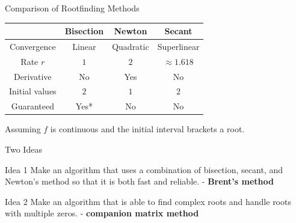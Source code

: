 \documentclass[10pt]{beamer}
\begin{document}
\begin{frame}{Comparison of Rootfinding Methods}

\begin{center}
\renewcommand{\arraystretch}{1.5}
\begin{tabular}{c|c|c|c}
 & Bisection & Newton & Secant \\ \hline
Convergence
    & Linear
    & Quadratic
    & Superlinear \\

Rate $r$
    & $1$
    & $2$
    & $\approx 1.618$ \\

Derivative
    & No
    & Yes
    & No \\

Initial values
    & $2$
    & $1$
    & $2$ \\

Guaranteed
    & Yes*
    & No
    & No
\end{tabular}
\end{center}

\vfill

{\small *Assuming $f$ is continuous and the initial interval brackets a root.}

\vfill


\end{frame}





\begin{frame}{Two Ideas}

\begin{block}{Idea 1}
    Make an algorithm that uses a combination of bisection, secant, and Newton's method so that it is both fast and reliable.  - \textbf{Brent's method}
\end{block}
\bigskip

\begin{block}{Idea 2}
    Make an algorithm that is able to find complex roots and handle roots with multiple zeros. - \textbf{companion matrix method}
\end{block}
    
\end{frame}
\end{document}
